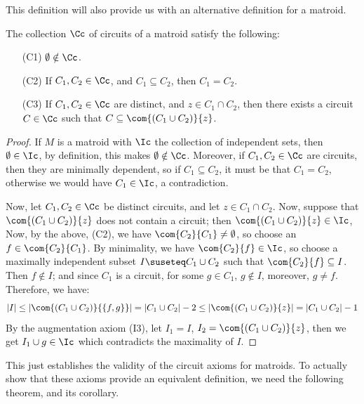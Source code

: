 This definition will also provide us with an alternative definition for a
matroid.

\begin{lemma}\label{1.1.1}
    The collection $\Cc$ of circuits of a matroid satisfy the following:
    \begin{enumerate}
        \item[(C1)] $\emptyset \notin \Cc$.

        \item[(C2)] If $C_1, C_2 \in \Cc$, and $C_1 \subseteq C_2$, then
            $C_1=C_2$.

        \item[(C3)] If $C_1, C_2 \in \Cc$ are distinct, and $z \in C_1 \cap
            C_2$, then there exists a circuit $C \in \Cc$ such that $C \subseteq
            \com{(C_1 \cup C_2)}{z}$.
    \end{enumerate}
\end{lemma}
\begin{proof}
    If $M$ is a matroid with  $\Ic$ the collection of independent sets, then
    $\emptyset \in \Ic$, by definition, this makes  $\emptyset \notin \Cc$.
    Moreover, if $C_1,C_2 \in \Cc$ are circuits, then they are minimally
    dependent, so if $C_1 \subseteq C_2$, it must be that $C_1=C_2$, otherwise
    we would have $C_1 \in \Ic$, a contradiction.

    Now, let $C_1,C_2 \in \Cc$ be distinct circuits, and let $z \in C_1 \cap
    C_2$. Now, suppose that $\com{(C_1 \cup C_2)}{z}$ does not contain a
    circuit; then $\com{(C_1 \cup C_2)}{z} \in \Ic$, Now, by the above, (C2),
    we have $\com{C_2}{C_1} \neq \emptyset$, so choose an $f \in \com{C_2}{C_1}$.
    By minimality, we have $\com{C_2}{f} \in \Ic$, so choose a maximally
    independent subset $I \suseteq C_1 \cup C_2$ such that $\com{C_2}{f}
    \subseteq I$. Then $f \notin I$; and since  $C_1$ is a circuit, for some $g
    \in C_1$, $g \notin I$, moreover,  $g \neq f$. Therefore, we have:
    \begin{equation*}
        |I| \leq |\com{(C_1 \cup C_2)}{\{f,g\}}|=|C_1 \cup C_2|-2 \leq
        |\com{(C_1 \cup C_2)}{z}|=|C_1 \cup C_2|-1
    \end{equation*}
    By the augmentation axiom (I3), let $I_1=I$, $I_2=\com{(C_1 \cup C_2)}{z}$,
    then we get $I_1 \cup g \in \Ic$ which contradicts the maximality of $I$.
\end{proof}
\begin{remark}
    This just establishes the validity of the circuit axioms for matroids. To
    actually show that these axioms provide an equivalent definition, we need
    the following theorem, and its corollary.
\end{remark}

